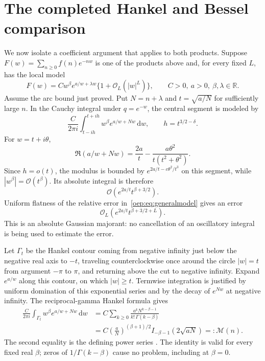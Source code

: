 \documentclass[11pt,letterpaper]{article}
\theoremstyle{remark}\newtheorem{remark}[theorem]{Remark}
\newcommand{\Reals}{\mathbb R}
\newcommand{\calM}{\mathcal M}
\newcommand{\dd}{\,\mathrm d}
\newcommand{\OO}{\mathcal O}
\begin{document}
\section{The completed Hankel and Bessel comparison}\label{oep:sec:bessel}
We now isolate a coefficient argument that applies to both products. Suppose $F(w)=\sum_{n\geq0}f(n)e^{-nw}$ is one of the products above and, for every fixed $L$, has the local model
\begin{equation}\label{oep:eq:generalmodel}
 F(w)=Cw^\beta e^{a/w+\lambda w}\{1+\OO_L(|w|^L)\},
 \qquad C>0,\ a>0,\ \beta,\lambda\in\Reals.
\end{equation}
Assume the arc bound just proved. Put $N=n+\lambda$ and $t=\sqrt{a/N}$ for sufficiently large $n$. In the Cauchy integral under $q=e^{-w}$, the central segment is modeled by
\begin{equation}\label{oep:eq:segment}
 \frac{C}{2\pi i}\int_{t-ih}^{t+ih}w^\beta e^{a/w+Nw}\dd w,
 \qquad h=t^{3/2-\delta}.
\end{equation}
For $w=t+i\theta$,
\begin{equation}\label{oep:eq:gaussian}
 \Re(a/w+Nw)=\frac{2a}t-\frac{a\theta^2}{t(t^2+\theta^2)}.
\end{equation}
Since $h=o(t)$, the modulus is bounded by $e^{2a/t-c\theta^2/t^3}$ on this segment, while $|w^\beta|=\OO(t^\beta)$. Its absolute integral is therefore
\begin{equation}\label{oep:eq:absolutegaussian}
 \OO\!\left(e^{2a/t}t^{\beta+3/2}\right).
\end{equation}
Uniform flatness of the relative error in~\eqref{oep:eq:generalmodel} gives an error
\begin{equation}\label{oep:eq:localerror}
 \OO_L\!\left(e^{2a/t}t^{\beta+3/2+L}\right).
\end{equation}
This is an absolute Gaussian majorant: no cancellation of an oscillatory integral is being used to estimate the error.

Let $\Gamma_t$ be the Hankel contour coming from negative infinity just below the negative real axis to $-t$, traveling counterclockwise once around the circle $|w|=t$ from argument $-\pi$ to $\pi$, and returning above the cut to negative infinity. Expand $e^{a/w}$ along this contour, on which $|w|\geq t$. Termwise integration is justified by uniform domination of this exponential series and by the decay of $e^{Nw}$ at negative infinity. The reciprocal-gamma Hankel formula \cite{dlmfgamma} gives
\begin{align}
 \frac{C}{2\pi i}\int_{\Gamma_t}w^\beta e^{a/w+Nw}\dd w
 &=C\sum_{k\geq0}\frac{a^kN^{k-\beta-1}}{k!\,\Gamma(k-\beta)}\label{oep:eq:hankelser}\\
 &=C\left(\frac aN\right)^{(\beta+1)/2}
        I_{-\beta-1}(2\sqrt{aN})=:\calM(n).\label{oep:eq:Mn}
\end{align}
The second equality is the defining power series \cite{dlmfbessel}. The identity is valid for every fixed real $\beta$; zeros of $1/\Gamma(k-\beta)$ cause no problem, including at $\beta=0$.
\end{document}
